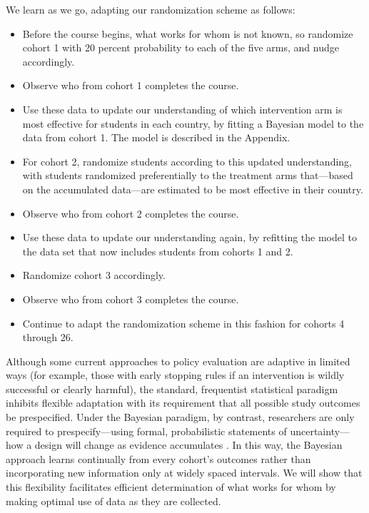 \documentclass{acm_proc_article-sp}
\begin{document}
We learn as we go, adapting our randomization scheme as follows:
\begin{itemize}
    \item Before the course begins, what works for whom is not known, so randomize cohort 1 with 20 percent probability to each of the five arms, and nudge accordingly.
    \item Observe who from cohort 1 completes the course.
    \item Use these data to update our understanding of which intervention arm is most effective for students in each country, by fitting a Bayesian model to the data from cohort 1. The model is described in the Appendix.
    \item For cohort 2, randomize students according to this updated understanding, with students randomized preferentially to the treatment arms that—based on the accumulated data—are estimated to be most effective in their country.
    \item Observe who from cohort 2 completes the course.
    \item Use these data to update our understanding again, by refitting the model to the data set that now includes students from cohorts 1 and 2.
    \item Randomize cohort 3 accordingly.
    \item Observe who from cohort 3 completes the course.
    \item Continue to adapt the randomization scheme in this fashion for cohorts 4 through 26.
\end{itemize}

Although some current approaches to policy evaluation are adaptive in limited ways (for example, those with early stopping rules if an intervention is wildly successful or clearly harmful), the standard, frequentist statistical paradigm inhibits flexible adaptation with its requirement that all possible study outcomes be prespecified. Under the Bayesian paradigm, by contrast, researchers are only required to prespecify—using formal, probabilistic statements of uncertainty—how a design will change as evidence accumulates \cite{berry2006bayesian, george1994stopping}. In this way, the Bayesian approach learns continually from every cohort's outcomes rather than incorporating new information only at widely spaced intervals. We will show that this flexibility facilitates efficient determination of what works for whom by making optimal use of data as they are collected.
\end{document}
